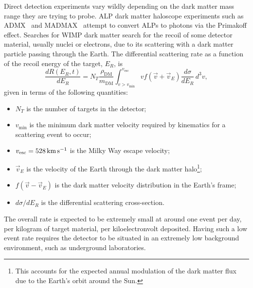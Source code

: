 Direct detection experiments vary wildly depending on the dark matter mass range they are trying to probe. ALP dark matter haloscope experiments such as ADMX~\cite{AD} and MADMAX~\cite{MADMAX:2019pub_mar_Newexperimentalapproach} attempt to convert ALPs to photons via the Primakoff effect. 
Searches for WIMP dark matter search for the recoil of some detector material, usually nuclei or electrons, due to its scattering with a dark matter particle passing through the Earth. The differential scattering rate as a function of the recoil energy of the target, $E_R$, is 
\begin{equation}
    \frac{d R(E_R, t)}{dE_R} = N_T \frac{\rho_\mathrm{DM}}{m_\mathrm{DM}}\int_{v>v_\mathrm{min}}^{v_\mathrm{esc}}v f(\Vec{v} + \vec{v}_E)\frac{d\sigma}{dE_R}\,d^3v,
\end{equation}
 given in terms of the following quantities:
\begin{itemize}
    \item $N_T$ is the number of targets in the detector;
    \item  $v_\mathrm{min}$ is the minimum dark matter velocity required by kinematics for a scattering event to occur;
    \item $v_\mathrm{esc} = 528{\rm \,km}{\rm \,s}^{-1}$ is the Milky Way escape velocity;
    \item $\vec{v}_E$ is the velocity of the Earth through the dark matter halo\footnote{This accounts for the expected annual modulation of the dark matter flux due to the Earth's orbit around the Sun.};
    \item $f(\vec{v} - \vec{v}_E)$ is the dark matter velocity distribution in the Earth's frame;
    \item $d\sigma/dE_R$ is the differential scattering cross-section.
\end{itemize}
The overall rate is expected to be extremely small at around one event per day, per kilogram of target material, per kiloelectronvolt deposited. Having such a low event rate requires the detector to be situated in an extremely low background environment, such as underground laboratories. 



